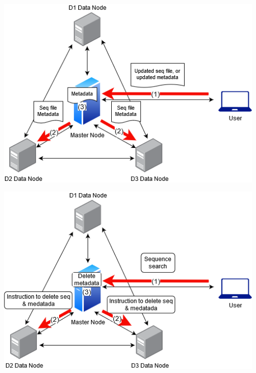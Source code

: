 \documentclass[acmsmall]{acmart}
\newenvironment{Figure}
  {\par\medskip\noindent\minipage{\linewidth}}
  {\endminipage\par\medskip}
\begin{document}
\begin{multicols}{2}
\begin{Figure}
\centering
\includegraphics[width=0.80\linewidth]{images/thesis1-Page-5.png} 
\end{Figure}

\begin{Figure}
\centering
\includegraphics[width=0.80\linewidth]{images/thesis1-zzzzz.png} 
\end{Figure}


\end{multicols}
\end{document}

